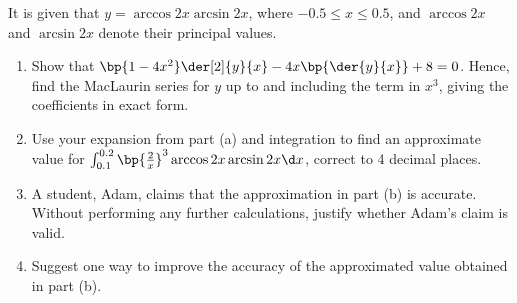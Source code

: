 \begin{problem}
    It is given that $y = \arccos{2x} \arcsin{2x}$, where $-0.5 \leq x \leq 0.5$, and $\arccos{2x}$ and $\arcsin{2x}$ denote their principal values.
    \begin{enumerate}
        \item Show that $\bp{1-4x^2} \der[2]{y}{x} - 4x \bp{\der{y}{x}} + 8 = 0$. Hence, find the MacLaurin series for $y$ up to and including the term in $x^3$, giving the coefficients in exact form.
        \item Use your expansion from part (a) and integration to find an approximate value for $\int_{0.1}^{0.2} \bp{\frac2x}^3 \arccos{2x}\arcsin{2x} \d x$, correct to 4 decimal places.
        \item A student, Adam, claims that the approximation in part (b) is accurate. Without performing any further calculations, justify whether Adam's claim is valid.
        \item Suggest one way to improve the accuracy of the approximated value obtained in part (b).
    \end{enumerate}
\end{problem}
